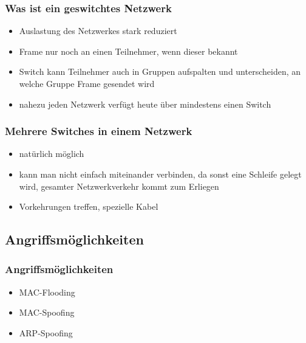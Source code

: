 \documentclass{beamer}
\begin{document}
        \begin{frame}
        	\frametitle{Was ist ein geswitchtes Netzwerk}
        	\begin{itemize}
        	\item Auslastung des Netzwerkes stark reduziert
        	\item Frame nur noch an einen Teilnehmer, wenn dieser bekannt
        	\item Switch kann Teilnehmer auch in Gruppen aufspalten und unterscheiden, an welche Gruppe Frame gesendet wird
        	\item nahezu jeden Netzwerk verfügt heute über mindestens einen Switch
        	\end{itemize} 	
    	\end{frame}
    	
    	\begin{frame}
	       	\frametitle{Mehrere Switches in einem Netzwerk}
	       	\begin{itemize}
	       	\item natürlich möglich
	       	\item kann man nicht einfach miteinander verbinden, da sonst eine Schleife gelegt wird, gesamter Netzwerkverkehr kommt zum Erliegen
	       	\item Vorkehrungen treffen, spezielle Kabel
	       	\end{itemize} 	
	   	\end{frame}
    	
    	\subsection*{Angriffsmöglichkeiten}
        \begin{frame}
        	\frametitle{Angriffsmöglichkeiten}
        	
        	\begin{itemize}
 
        	\item MAC-Flooding
  
        	\item MAC-Spoofing

        	\item ARP-Spoofing
        	\end{itemize}
                       	
    	\end{frame}
    	
\end{document}
